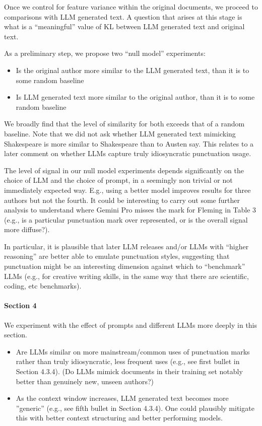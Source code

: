 \documentclass{article}
\begin{document}
Once we control for feature variance within the original documents, we proceed to comparisons with LLM generated text.
A question that arises at this stage is what is a ``meaningful'' value of KL between LLM generated text and original text. 

As a preliminary step, we propose two “null model” experiments:
\begin{itemize}
\item Is the original author more similar to the LLM generated text, than it is to some random baseline
\item Is LLM generated text more similar to the original author, than it is to some random baseline
\end{itemize}


We broadly find that the level of similarity for both exceeds that of a random baseline. Note that we did not ask whether LLM generated text mimicking Shakespeare is more similar to Shakespeare than to Austen say. This relates to a later comment on whether LLMs capture truly idiosyncratic punctuation usage. 


The level of signal in our null model experiments depends significantly on the choice of LLM and the choice of prompt, in a seemingly non trivial or not immediately expected way. E.g., using a better model improves results for three authors but not the fourth. It could be interesting to carry out some further analysis to understand where Gemini Pro misses the mark for Fleming in Table 3 (e.g., is a particular punctuation mark over represented, or is the overall signal more diffuse?). 

In particular, it is plausible that later LLM releases and/or LLMs with ``higher reasoning'' are better able to emulate punctuation styles, suggesting that punctuation might be an interesting dimension against which to “benchmark” LLMs (e.g., for creative writing skills, in the same way that there are scientific, coding, etc benchmarks). 


\paragraph{Section 4}

We experiment with the effect of prompts and different LLMs more deeply in this section. 

\begin{itemize}
\item Are LLMs similar on more mainstream/common uses of punctuation marks rather than truly idiosyncratic, less frequent uses (e.g., see first bullet in Section 4.3.4). (Do LLMs mimick documents in their training set notably better than genuinely new, unseen authors?) 
\item As the context window increases, LLM generated text becomes more ”generic” (e.g., see fifth bullet in Section 4.3.4). One could plausibly mitigate this with better context structuring and better performing models. 
\end{itemize}
\end{document}
